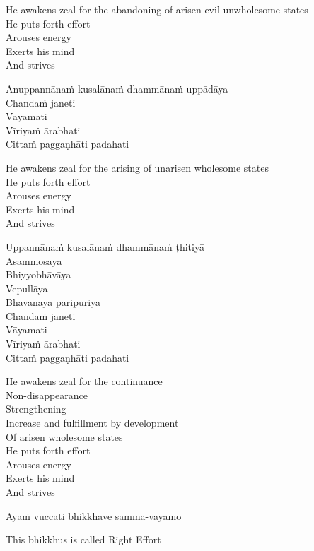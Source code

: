 \begin{cprenglish}
  He awakens zeal for the abandoning of arisen evil unwholesome states\\
  He puts forth effort\\
  Arouses energy\\
  Exerts his mind\\
  And strives
\end{cprenglish}

Anuppannānaṁ kusalānaṁ dhammānaṁ uppādāya\\
Chandaṁ janeti\\
Vāyamati\\
Vīriyaṁ ārabhati\\
Cittaṁ paggaṇhāti padahati

\begin{cprenglish}
  He awakens zeal for the arising of unarisen wholesome states\\
  He puts forth effort\\
  Arouses energy\\
  Exerts his mind\\
  And strives
\end{cprenglish}

Uppannānaṁ kusalānaṁ dhammānaṁ ṭhitiyā\\
Asammosāya\\
Bhiyyobhāvāya\\
Vepullāya\\
Bhāvanāya pāripūriyā\\
Chandaṁ janeti\\
Vāyamati\\
Vīriyaṁ ārabhati\\
Cittaṁ paggaṇhāti padahati

\begin{cprenglish}
  He awakens zeal for the continuance\\
  Non-disappearance\\
  Strengthening\\
  Increase and fulfillment by development\\
  Of arisen wholesome states\\
  He puts forth effort\\
  Arouses energy\\
  Exerts his mind\\
  And strives
\end{cprenglish}

Ayaṁ vuccati bhikkhave sammā-vāyāmo

\begin{cprenglish}
  This bhikkhus is called Right Effort
\end{cprenglish}

